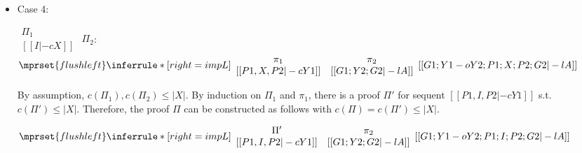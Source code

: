 \begin{itemize}
\item Case 4:
      \begin{center}
        \scriptsize
        \begin{math}
          \begin{array}{c}
            \Pi_1 \\
            {[[I |-c X]]}
          \end{array}
        \end{math}
        \qquad\qquad
        $\Pi_2$:
        \begin{math}
          $$\mprset{flushleft}
          \inferrule* [right={\tiny impL}] {
            {
              \begin{array}{cc}
                \pi_1 & \pi_2 \\
                {[[P1, X, P2 |-c Y1]]} & {[[G1; Y2; G2 |-l A]]}
              \end{array}
            }
          }{[[G1; Y1 -o Y2; P1; X; P2; G2 |-l A]]}
        \end{math}
      \end{center}
      By assumption, $c(\Pi_1),c(\Pi_2)\leq |X|$. By induction on $\Pi_1$
      and $\pi_1$, there is a proof $\Pi'$ for sequent
      $[[P1, I, P2 |-c Y1]]$ s.t. $c(\Pi') \leq |X|$. Therefore, the proof
      $\Pi$ can be constructed as follows with $c(\Pi) = c(\Pi') \leq |X|$.
      \begin{center}
        \scriptsize
        \begin{math}
          $$\mprset{flushleft}
          \inferrule* [right={\tiny impL}] {
            {
              \begin{array}{cc}
                \Pi' & \pi_2 \\
                {[[P1, I, P2 |-c Y1]]} & {[[G1; Y2; G2 |-l A]]}
              \end{array}
            }
          }{[[G1; Y1 -o Y2; P1; I; P2; G2 |-l A]]}
        \end{math}
      \end{center}


\end{itemize}
